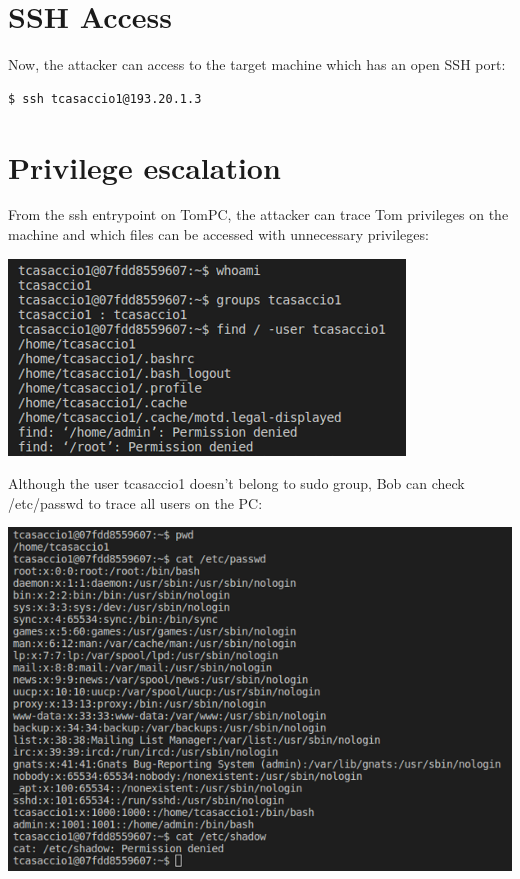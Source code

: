 \documentclass[a4paper, 12pt, oneside]{extbook}
\begin{document}
\section{SSH Access}
Now, the attacker can access to the target machine which has an open SSH port:
\begin{lstlisting}[style=DOS]
$ ssh tcasaccio1@193.20.1.3
\end{lstlisting}

\section{Privilege escalation}
From the ssh entrypoint on TomPC, the attacker can trace Tom privileges on the machine 
and which files can be accessed with unnecessary privileges:
\begin{center}
  \includegraphics[scale=1]{../Image/privilege_escalation_whoami.PNG}
\end{center}
Although the user tcasaccio1 doesn't belong to sudo group, Bob can check  
/etc/passwd to trace all users on the PC: 
\begin{center}
  \includegraphics[scale=0.8]{../Image/privilege_escalation_passwd.PNG}
\end{center}
\end{document}
